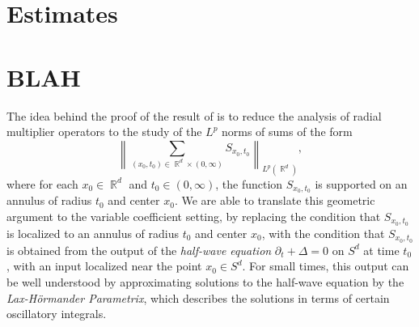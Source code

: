 \documentclass[dvipsnames,letterpaper,12pt]{article}
\DeclareMathOperator{\RR}{\mathbb{R}}
\begin{document}
\section{Estimates}

\section{BLAH}



\begin{comment}

This cannot be true 
%
\[ \sup_{R > 0} \| T_{m_R} \|_{L^p(\RR^d) \to L^p(\RR^d)} = \| T_m \|_{L^p(\RR^d) \to L^p(\RR^d)}. \]
%
On the other hand, even a weaker version of the analogous result on $M$, i.e.
%
\begin{equation} \label{weakanalogousversion}
    \sup_{R > 0} \| m_R(P) \|_{L^p(M) \to L^p(M)} \sim \| m(P) \|_{L^p(M) \to L^p(M)},
\end{equation}
%
\emph{cannot be true}. Indeed, spectral theory implies $\Lambda_M \cap [1/2,2]$ is a finite set $\{ \lambda_1, \dots, \lambda_k \}$, and so 
%
\[ m(P) = m(\lambda_1) \mathcal{P}_{\lambda_1} + \dots + m(\lambda_k) \mathcal{P}_{\lambda_k}, \]
%
so the triangle inequality implies

\[ \| m(P) \|_{L^p(M) \to L^p(M)} \leq \| m \|_{l^\infty(\RR)} \max_{1 \leq j \leq k} \| \mathcal{P}_{\lambda_j} \|_{L^p(M) \to L^p(M)} \lesssim \| m \|_{l^\infty(\RR)}, \]
%
where the $L^p$ boundedness of the operators $\mathcal{P}_{\lambda_j}$ follows by H\"{o}lder inequality because $\mathcal{V}_{\lambda_j}$ is a finite dimensional subspace of $C^\infty(M)$, and $C^\infty(M)$ is contained in $L^q(M)$ for any $1 \leq q \leq \infty$. Thus \eqref{weakanalogousversion} would imply that
%
\[ \sup_{R > 0} \| m_R(P) \|_{L^p(M) \to L^p(M)} \sim \| m \|_{l^\infty(\RR)}, \]
%
and this \emph{cannot} be true for

\end{comment}

The idea behind the proof of the result of \cite{HeoandNazarovandSeeger} is to reduce the analysis of radial multiplier operators to the study of the $L^p$ norms of sums of the form
%
\[ \left\| \sum_{(x_0,t_0) \in \RR^d \times (0,\infty)} {S\!}_{x_0,t_0} \right\|_{L^p(\RR^d)}, \]
%
where for each $x_0 \in \RR^d$ and $t_0 \in (0,\infty)$, the function ${S\!}_{x_0,t_0}$ is supported on an annulus of radius $t_0$ and center $x_0$. We are able to translate this geometric argument to the variable coefficient setting, by replacing the condition that ${S\!}_{x_0,t_0}$ is localized to an annulus of radius $t_0$ and center $x_0$, with the condition that ${S\!}_{x_0,t_0}$ is obtained from the output of the \emph{half-wave equation} $\partial_t + \Delta = 0$ on $S^d$ at time $t_0$, with an input localized near the point $x_0 \in S^d$. For small times, this output can be well understood by approximating solutions to the half-wave equation by the \emph{Lax-H\"{o}rmander Parametrix}, which describes the solutions in terms of certain oscillatory integrals.
\end{document}

